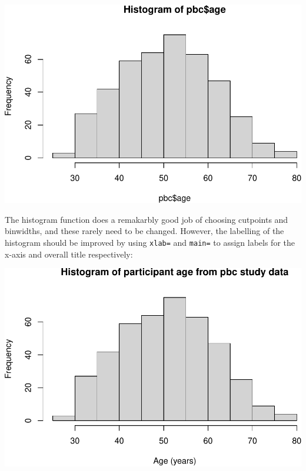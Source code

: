 \documentclass[
]{memoir}
\newenvironment{Shaded}{\begin{snugshade}}{\end{snugshade}}
\newcommand{\AttributeTok}[1]{\textcolor[rgb]{0.77,0.63,0.00}{#1}}
\newcommand{\FunctionTok}[1]{\textcolor[rgb]{0.00,0.00,0.00}{#1}}
\newcommand{\NormalTok}[1]{#1}
\newcommand{\SpecialCharTok}[1]{\textcolor[rgb]{0.00,0.00,0.00}{#1}}
\newcommand{\StringTok}[1]{\textcolor[rgb]{0.31,0.60,0.02}{#1}}
\begin{document}
\includegraphics{01-IntroToR_files/figure-latex/unnamed-chunk-28-1.pdf}

The histogram function does a remakarbly good job of choosing cutpoints and binwidths, and these rarely need to be changed. However, the labelling of the histogram should be improved by using \texttt{xlab=} and \texttt{main=} to assign labels for the x-axis and overall title respectively:

\begin{Shaded}
\end{Shaded}

\includegraphics{01-IntroToR_files/figure-latex/unnamed-chunk-29-1.pdf}
\end{document}
